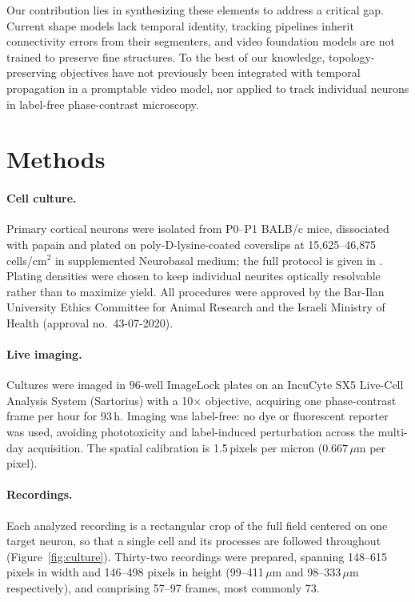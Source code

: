 \documentclass[11pt,a4paper]{article}
\makeatletter
\let\SD@subsection\subsection
\renewcommand\subsection{\FloatBarrier\@ifstar{\SD@subsection*}{\SD@subsection}}
\makeatother
\begin{document}
Our contribution lies in synthesizing these elements to address a critical
gap. Current shape models lack temporal identity, tracking pipelines inherit
connectivity errors from their segmenters, and video foundation models are
not trained to preserve fine structures. To the best of our knowledge,
topology-preserving objectives have not previously been integrated with
temporal propagation in a promptable video model, nor applied to track
individual neurons in label-free phase-contrast microscopy.

\section{Methods}
\label{sec:methods}

\subsection{Data and annotation}
\label{sec:met:data}

\paragraph{Cell culture.}
Primary cortical neurons were isolated from P0--P1 BALB/c mice, dissociated
with papain and plated on poly-D-lysine-coated coverslips at
15{,}625--46{,}875\,cells/cm$^2$ in supplemented Neurobasal medium; the full
protocol is given in \cite{berkovich2025neurite}. Plating densities were
chosen to keep individual neurites optically resolvable rather than to
maximize yield. All procedures were approved by the Bar-Ilan University
Ethics Committee for Animal Research and the Israeli Ministry of Health
(approval no.~43-07-2020).

\paragraph{Live imaging.}
Cultures were imaged in 96-well ImageLock plates on an IncuCyte SX5
Live-Cell Analysis System (Sartorius) with a 10$\times$ objective, acquiring
one phase-contrast frame per hour for 93\,h. Imaging was label-free: no dye
or fluorescent reporter was used, avoiding phototoxicity and
label-induced perturbation across the multi-day acquisition. The spatial
calibration is 1.5\,pixels per micron ($0.667\,\mu$m per pixel).

\paragraph{Recordings.}
Each analyzed recording is a rectangular crop of the full field centered on
one target neuron, so that a single cell and its processes are followed
throughout (Figure~\ref{fig:culture}). Thirty-two recordings were prepared,
spanning 148--615 pixels in width and 146--498 pixels in height
(99--411\,$\mu$m and 98--333\,$\mu$m respectively), and comprising 57--97
frames, most commonly 73.
\end{document}
